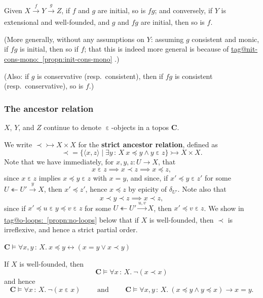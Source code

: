 \documentclass{amsart}
\makeatletter
\newcommand\AND{\text{ and }}
\newcommand\bC{\mathbf{C}}
\newcommand\br[1]{\langle{}#1\rangle{}}
\newcommand\defword[1]{{\boldmath \textbf{#1}}}
\newcommand\ein{\mathrel{\varepsilon}}
\newcommand\oot{\twoheadleftarrow}
\newcommand\set[2][]{#1\{ #2 #1\}}
\newcommand\tolon{{\,:\,}}
\newcommand\tot{\leftrightarrow}
\newcommand\tox[2][]{\xrightarrow[#1]{#2}}
\newcommand\tto{\rightarrowtail}
\newcommand\unein{{\ein}}
\newcommand\prooflabel[1]{\gdef\proof@label{#1}}
\def\proof@label{}
\newcommand\tagword[1]{\csname tag@#1\endcsname}
\def\label@tag#1:#2\@nil{#1}
\newcommand\labeltag[1]{\label@tag#1:\@nil}
\newcommand\jref[1]{%
  \texorpdfstring%
    {\hyperref[#1]{\tagword{\labeltag{#1}}~\ref*{#1}}}%
    {\tagword{\labeltag{#1}}~\ref*{#1}}%
}
\theoremstyle{definition}
\theoremstyle{remark}
\theoremstyle{plainwithref}
\makeatother
\begin{document}
\prooflabel{proof:init-2-of-3}
\begin{propn} \label{propn:init-2-of-3}
  Given \( X \tox{f} Y \tox{g} Z \), if \( f \) and \( g \) are initial, so is \( f g \); and conversely, if \( Y \) is extensional and well-founded, and \( g \) and \( f g \) are initial, then so is \( f \).

  \noindent
  (More generally, without any assumptions on \( Y \): assuming \( g \) consistent and monic, if \( f g \) is initial, then so if \( f \); that this is indeed more general is because of \jref{propn:init-cons-mono}.)

  \noindent
  (Also: if \( g \) is conservative (resp.\ consistent), then if \( f g \) is consistent (resp.\ conservative), so is \( f \).)
\end{propn}

\subsubsection{The ancestor relation}
\( X \), \( Y \), and \( Z \) continue to denote \( \unein \)-objects in a topos \( \bC \).
\begin{defn} \label{defn:strict-ancestor}
  We write \( {\prec} \tto X \times X \) for the \defword{strict ancestor relation}, defined as
  \[
    {\prec} = \set{\br{x,z} \mid \exists y \tolon X\ x \preceq y \wedge y \ein z} \tto X \times X.
  \]
  Note that we have immediately, for \( x,y,z \colon U \to X \), that
  \[
    x \ein z \implies x \prec z \implies x \preceq z,
  \]
  since \( x \ein z \) implies \( x \preceq y \ein z \) with \( x = y \), and since, if \( x' \preceq y \ein z' \) for some \( U \oot U' \tox{y} X \), then \( x' \preceq z' \), hence \( x \preceq z \) by epicity of \( \delta_{U'} \).
  Note also that
  \[
    x \prec y \prec z \implies x \prec z,
  \]
  since if \( x' \preceq u \ein y \preceq v \ein z \) for some \( U \oot U' \tox{u,v} X \), then \( x' \preceq v \ein z \).
  We show in \jref{propn:no-loops} below that if \( X \) is well-founded, then \( \prec \) is irreflexive, and hence a strict partial order.
\end{defn}

\prooflabel{proof:dwn-opts}
\begin{propn} \label{propn:dwn-opts}
  \( \bC \vDash \forall x,y \tolon X.\ x \preceq y \tot (x = y \vee x \prec y) \)
\end{propn}

\prooflabel{proof:no-loops}
\begin{propn} \label{propn:no-loops}
  If \( X \) is well-founded, then
  \[
    \bC \vDash \forall x \tolon X.\ \neg (x \prec x)
  \]
  and hence
  \[
    \bC \vDash \forall x \tolon X.\ \neg (x \ein x)
    \qquad
    \AND
    \qquad
    \bC \vDash \forall x,y \tolon X.\ (x \preceq y \wedge y \preceq x) \to x = y.
  \]
\end{propn}
\end{document}
